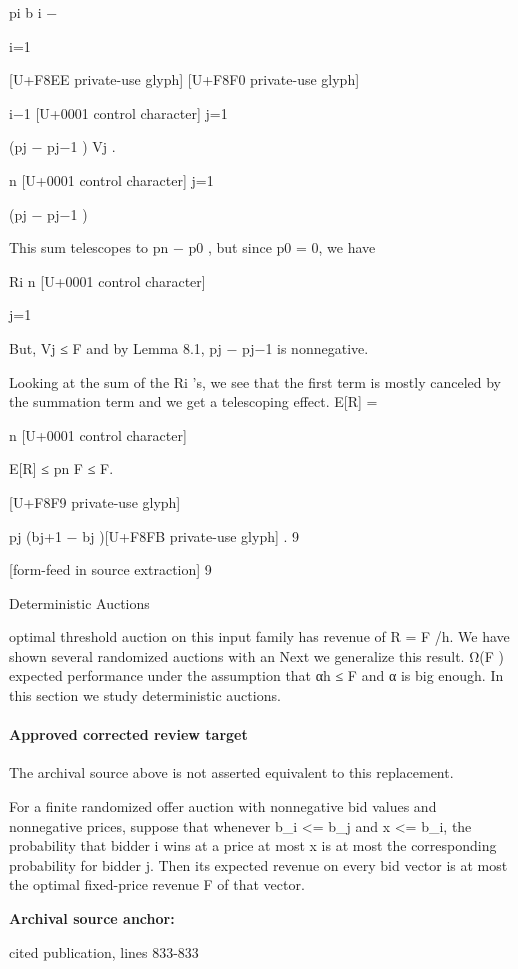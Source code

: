 \documentclass[10pt]{article}
\begin{document}
\begin{ReviewVerbatim}
pi b i −

i=1

[U+F8EE private-use glyph]
[U+F8F0 private-use glyph]

i−1
[U+0001 control character]
j=1

(pj − pj−1 ) Vj .

n
[U+0001 control character]
j=1

(pj − pj−1 )

This sum telescopes to pn − p0 , but since p0 = 0, we
have

Ri
n
[U+0001 control character]

j=1

But, Vj ≤ F and by Lemma 8.1, pj − pj−1 is nonnegative.

Looking at the sum of the Ri ’s, we see that the first
term is mostly canceled by the summation term and
we get a telescoping effect.
E[R] =

n
[U+0001 control character]

E[R] ≤ pn F ≤ F.

[U+F8F9 private-use glyph]

pj (bj+1 − bj )[U+F8FB private-use glyph] .
9


[form-feed in source extraction]
9

Deterministic Auctions

optimal threshold auction on this input family has
revenue of R = F /h.
We have shown several randomized auctions with an
Next we generalize this result.
Ω(F ) expected performance under the assumption
that αh ≤ F and α is big enough. In this section
we study deterministic auctions.
\end{ReviewVerbatim}

\paragraph{Approved corrected review target}
The archival source above is not asserted equivalent to this replacement.
\begin{ReviewVerbatim}
For a finite randomized offer auction with nonnegative bid values and nonnegative prices, suppose that whenever b_i <= b_j and x <= b_i, the probability that bidder i wins at a price at most x is at most the corresponding probability for bidder j. Then its expected revenue on every bid vector is at most the optimal fixed-price revenue F of that vector.
\end{ReviewVerbatim}

\textbf{Archival source anchor:} {\footnotesize\raggedright cited publication, lines 833-\allowbreak{}833\par}
\end{document}
